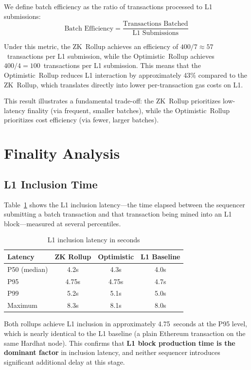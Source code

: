 \documentclass[
]{elteikthesis}[2024/04/26]
\begin{document}
We define batch efficiency as the ratio of transactions processed to L1 submissions:
\begin{equation}
\text{Batch Efficiency} = \frac{\text{Transactions Batched}}{\text{L1 Submissions}}
\end{equation}

Under this metric, the ZK~Rollup achieves an efficiency of $400 / 7 \approx 57$~transactions per L1 submission, while the Optimistic~Rollup achieves $400 / 4 = 100$~transactions per L1 submission. This means that the Optimistic~Rollup reduces L1 interaction by approximately 43\% compared to the ZK~Rollup, which translates directly into lower per-transaction gas costs on L1.

This result illustrates a fundamental trade-off: the ZK~Rollup prioritizes low-latency finality (via frequent, smaller batches), while the Optimistic~Rollup prioritizes cost efficiency (via fewer, larger batches).

\section{Finality Analysis}

\subsection{L1 Inclusion Time}
Table~\ref{tab:l1-latency} shows the L1 inclusion latency---the time elapsed between the sequencer submitting a batch transaction and that transaction being mined into an L1 block---measured at several percentiles.

\begin{table}[h]
    \centering
    \begin{tabular}{l|c|c|c}
        \hline
        \textbf{Latency} & \textbf{ZK Rollup} & \textbf{Optimistic} & \textbf{L1 Baseline} \\
        \hline
        P50 (median) & 4.2s & 4.3s & 4.0s \\
        \hline
        P95 & 4.75s & 4.75s & 4.7s \\
        \hline
        P99 & 5.2s & 5.1s & 5.0s \\
        \hline
        Maximum & 8.3s & 8.1s & 8.0s \\
        \hline
    \end{tabular}
    \caption{L1 inclusion latency in seconds}
    \label{tab:l1-latency}
\end{table}

Both rollups achieve L1 inclusion in approximately 4.75~seconds at the P95 level, which is nearly identical to the L1 baseline (a plain Ethereum transaction on the same Hardhat node). This confirms that \textbf{L1 block production time is the dominant factor} in inclusion latency, and neither sequencer introduces significant additional delay at this stage.
\end{document}
